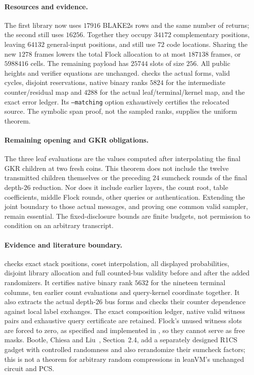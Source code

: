 \paragraph{Resources and evidence.} The first library now uses $17916$ BLAKE2s rows and the same number of returns; the second still uses $16256$. Together they occupy $34172$ complementary positions, leaving $64132$ general-input positions, and still use $72$ code locations. Sharing the new $1278$ frames lowers the total Flock allocation to at most $187138$ frames, or $5988416$ cells. The remaining payload has $25744$ slots of size $256$. All public heights and verifier equations are unchanged.  checks the actual forms, valid cycles, disjoint reservations, native binary ranks $5824$ for the intermediate counter/residual map and $4288$ for the actual leaf/terminal/kernel map, and the exact error ledger. Its \texttt{--matching} option exhaustively certifies the relocated source. The symbolic span proof, not the sampled ranks, supplies the uniform theorem.

\paragraph{Remaining opening and GKR obligations.} The three leaf evaluations are the values computed after interpolating the final GKR children at two fresh coins. This theorem does not include the twelve transmitted children themselves or the preceding $24$ sumcheck rounds of the final depth-$26$ reduction. Nor does it include earlier layers, the count root, table coefficients, middle Flock rounds, other queries or authentication. Extending the joint boundary to those actual messages, and proving one common valid sampler, remain essential. The fixed-disclosure bounds are finite budgets, not permission to condition on an arbitrary transcript.

\paragraph{Evidence and literature boundary.}  checks exact stack positions, coset interpolation, all displayed probabilities, disjoint library allocation and full counted-bus validity before and after the added randomizers. It certifies native binary rank $5632$ for the nineteen terminal columns, ten earlier count evaluations and query-kernel coordinate together. It also extracts the actual depth-$26$ bus forms and checks their counter dependence against local label exchanges. The exact composition ledger, native valid witness pairs and exhaustive query certificate are retained. Flock's unused witness slots are forced to zero, as specified and implemented in , so they cannot serve as free masks. Bootle, Chiesa and Liu~\cite{bcl}, Section~2.4, add a separately designed R1CS gadget with controlled randomness and also rerandomize their sumcheck factors; this is not a theorem for arbitrary random compressions in leanVM's unchanged circuit and PCS.
